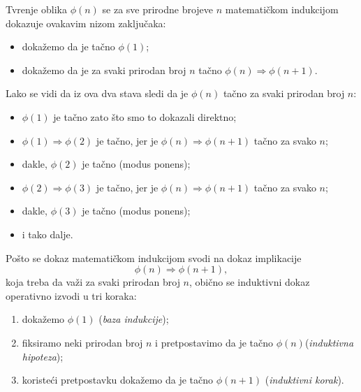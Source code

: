 Tvr\dj enje oblika $\phi(n)$ se za sve prirodne brojeve $n$ matemati\v ckom indukcijom dokazuje
ovakavim nizom zaklju\v caka:
\begin{itemize}\itemsep -1pt
\item doka\v zemo da je ta\v cno $\phi(1)$;
\item doka\v zemo da je za svaki prirodan broj $n$ ta\v cno $\phi(n) \Rightarrow \phi(n+1)$.
\end{itemize}
Lako se vidi da iz ova dva stava sledi da je $\phi(n)$ ta\v cno za svaki prirodan broj $n$:
\begin{itemize}\itemsep -1pt
\item $\phi(1)$ je ta\v cno zato \v sto smo to dokazali direktno;
\item $\phi(1) \Rightarrow \phi(2)$ je ta\v cno, jer je $\phi(n) \Rightarrow \phi(n+1)$ ta\v cno za svako $n$;
\item dakle, $\phi(2)$ je ta\v cno (modus ponens);
\item $\phi(2) \Rightarrow \phi(3)$ je ta\v cno, jer je $\phi(n) \Rightarrow \phi(n+1)$ ta\v cno za svako $n$;
\item dakle, $\phi(3)$ je ta\v cno (modus ponens);
\item i tako dalje.
\end{itemize}
Po\v sto se dokaz matemati\v ckom indukcijom svodi na dokaz implikacije
$$
  \phi(n) \Rightarrow \phi(n+1),
$$
koja treba da va\v zi za svaki prirodan broj $n$, obi\v cno se induktivni dokaz operativno izvodi u tri koraka:
\begin{enumerate}
\item doka\v zemo $\phi(1)$ (\emph{baza indukcije});
\item fiksiramo neki prirodan broj $n$ i pretpostavimo da je ta\v cno $\phi(n)$\newline (\emph{induktivna hipoteza});
\item koriste\'ci pretpostavku doka\v zemo da je ta\v cno $\phi(n + 1)$ (\emph{induktivni korak}).
\end{enumerate}

  
